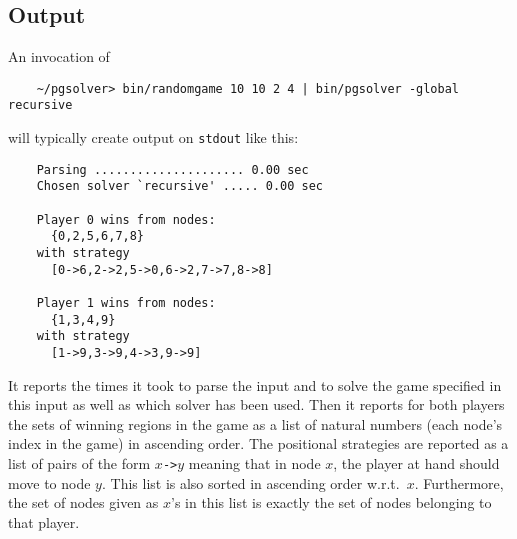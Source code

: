


\subsection{Output}

An invocation of
\begin{verbatim}
    ~/pgsolver> bin/randomgame 10 10 2 4 | bin/pgsolver -global recursive
\end{verbatim}
will typically create output on \texttt{stdout} like this:
\begin{verbatim}
    Parsing ..................... 0.00 sec
    Chosen solver `recursive' ..... 0.00 sec

    Player 0 wins from nodes:
      {0,2,5,6,7,8}
    with strategy
      [0->6,2->2,5->0,6->2,7->7,8->8]

    Player 1 wins from nodes:
      {1,3,4,9}
    with strategy
      [1->9,3->9,4->3,9->9]
\end{verbatim}
It reports the times it took to parse the input and to solve the game specified in this input
as well as which solver has been used. Then it reports for both players the sets of winning
regions in the game as a list of natural numbers (each node's index in the game) in ascending order.
The positional strategies are reported as a list of pairs of the form $x$\texttt{->}$y$ meaning
that in node $x$, the player at hand should move to node $y$. This list is also sorted in
ascending order w.r.t.\ $x$. Furthermore, the set of nodes given as $x$'s in this list is
exactly the set of nodes belonging to that player.




